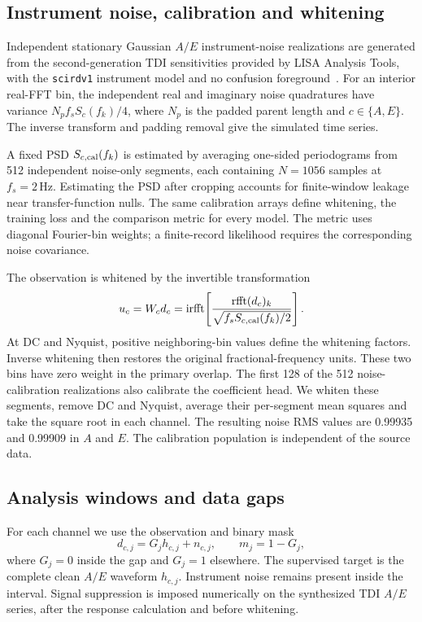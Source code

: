 \documentclass[10pt,prd,aps,a4paper,twocolumn,superscriptaddress,nofootinbib,floatfix]{revtex4-2}
\begin{document}
\subsection{Instrument noise, calibration and whitening}\label{noise model}
Independent stationary Gaussian $A/E$ instrument-noise realizations are generated from the second-generation TDI sensitivities provided by LISA Analysis Tools, with the \texttt{scirdv1} instrument model and no confusion foreground~\cite{LISAAnalysisTools}. For an interior real-FFT bin, the independent real and imaginary noise quadratures have variance $N_p f_s S_c(f_k)/4$, where $N_p$ is the padded parent length and $c\in\{A,E\}$. The inverse transform and padding removal give the simulated time series.

A fixed PSD $S_{c,\rm cal}(f_k)$ is estimated by averaging one-sided periodograms from 512 independent noise-only segments, each containing $N=1056$ samples at $f_s=2\,\mathrm{Hz}$. Estimating the PSD after cropping accounts for finite-window leakage near transfer-function nulls. The same calibration arrays define whitening, the training loss and the comparison metric for every model. The metric uses diagonal Fourier-bin weights; a finite-record likelihood requires the corresponding noise covariance.

The observation is whitened by the invertible transformation
\begin{equation}
u_c=W_cd_c=\operatorname{irfft}\!\left[
\frac{\operatorname{rfft}(d_c)_k}{\sqrt{f_sS_{c,\rm cal}(f_k)/2}}\right].\label{eq:whitening}
\end{equation}
At DC and Nyquist, positive neighboring-bin values define the whitening factors. Inverse whitening then restores the original fractional-frequency units. These two bins have zero weight in the primary overlap. The first 128 of the 512 noise-calibration realizations also calibrate the coefficient head. We whiten these segments, remove DC and Nyquist, average their per-segment mean squares and take the square root in each channel. The resulting noise RMS values are 0.99935 and 0.99909 in $A$ and $E$. The calibration population is independent of the source data.

\subsection{Analysis windows and data gaps}\label{sec:gaps}
For each channel we use the observation and binary mask
\begin{equation}
d_{c,j}=G_jh_{c,j}+n_{c,j},\qquad m_j=1-G_j,\label{eq:observation}
\end{equation}
where $G_j=0$ inside the gap and $G_j=1$ elsewhere. The supervised target is the complete clean $A/E$ waveform $h_{c,j}$. Instrument noise remains present inside the interval. Signal suppression is imposed numerically on the synthesized TDI $A/E$ series, after the response calculation and before whitening.
\end{document}
